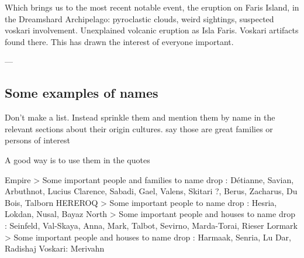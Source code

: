 Which brings us to the most recent notable event, the eruption on Faris Island, in the Dreamshard Archipelago: pyroclastic clouds, weird sightings, suspected voskari involvement. Unexplained volcanic eruption as Isla Faris. Voskari artifacts found there. This has drawn the interest of everyone important.








---




\subsection{Some examples of names}

Don't make a list. Instead sprinkle them and mention them by name in the relevant sections about their origin cultures. say those are great families or persons of interest

A good way is to use them in the quotes

Empire > Some important people and families to name drop : Détianne, Savian, Arbuthnot, Lucius Clarence, Sabadi, Gael, Valens, Skitari ?, Berus, Zacharus, Du Bois, Talborn
HEREROQ > Some important people to name drop : Hesria, Lokdan, Nusal, Bayaz
North > Some important people and houses to name drop : Seinfeld, Val-Skaya, Anna, Mark, Talbot, Sevirno, Marda-Torai, Rieser
Lormark > Some important people and houses to name drop : Harmaak, Senria, Lu Dar, Radishaj
Voskari: Merivahn

